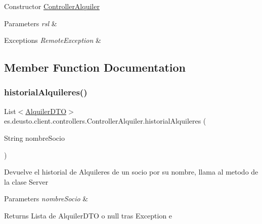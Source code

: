 Constructor \mbox{\hyperlink{classes_1_1deusto_1_1client_1_1controllers_1_1_controller_alquiler}{Controller\+Alquiler}} 
\begin{DoxyParams}{Parameters}
{\em rsl} & \\
\hline
\end{DoxyParams}

\begin{DoxyExceptions}{Exceptions}
{\em Remote\+Exception} & \\
\hline
\end{DoxyExceptions}


\subsection{Member Function Documentation}
\mbox{\label{classes_1_1deusto_1_1client_1_1controllers_1_1_controller_alquiler_a1e6149df6b15308215186c42c73781aa}} 
\subsubsection{\texorpdfstring{historialAlquileres()}{historialAlquileres()}}
{\footnotesize\ttfamily List$<$\mbox{\hyperlink{classes_1_1deusto_1_1server_1_1dto_1_1_alquiler_d_t_o}{Alquiler\+D\+TO}}$>$ es.\+deusto.\+client.\+controllers.\+Controller\+Alquiler.\+historial\+Alquileres (\begin{DoxyParamCaption}\item[{String}]{nombre\+Socio }\end{DoxyParamCaption})}

Devuelve el historial de Alquileres de un socio por su nombre, llama al metodo de la clase Server 
\begin{DoxyParams}{Parameters}
{\em nombre\+Socio} & \\
\hline
\end{DoxyParams}
\begin{DoxyReturn}{Returns}
Lista de Alquiler\+D\+TO o null tras Exception e 
\end{DoxyReturn}
\mbox{\label{classes_1_1deusto_1_1client_1_1controllers_1_1_controller_alquiler_ad256b3ea1f84492bcbda49c58f914ffa}} 
